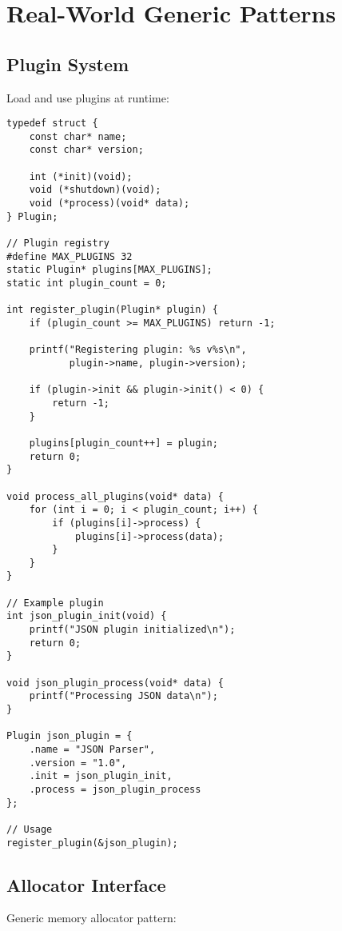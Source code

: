 \section{Real-World Generic Patterns}

\subsection{Plugin System}

Load and use plugins at runtime:

\begin{lstlisting}
typedef struct {
    const char* name;
    const char* version;

    int (*init)(void);
    void (*shutdown)(void);
    void (*process)(void* data);
} Plugin;

// Plugin registry
#define MAX_PLUGINS 32
static Plugin* plugins[MAX_PLUGINS];
static int plugin_count = 0;

int register_plugin(Plugin* plugin) {
    if (plugin_count >= MAX_PLUGINS) return -1;

    printf("Registering plugin: %s v%s\n",
           plugin->name, plugin->version);

    if (plugin->init && plugin->init() < 0) {
        return -1;
    }

    plugins[plugin_count++] = plugin;
    return 0;
}

void process_all_plugins(void* data) {
    for (int i = 0; i < plugin_count; i++) {
        if (plugins[i]->process) {
            plugins[i]->process(data);
        }
    }
}

// Example plugin
int json_plugin_init(void) {
    printf("JSON plugin initialized\n");
    return 0;
}

void json_plugin_process(void* data) {
    printf("Processing JSON data\n");
}

Plugin json_plugin = {
    .name = "JSON Parser",
    .version = "1.0",
    .init = json_plugin_init,
    .process = json_plugin_process
};

// Usage
register_plugin(&json_plugin);
\end{lstlisting}

\subsection{Allocator Interface}

Generic memory allocator pattern:

